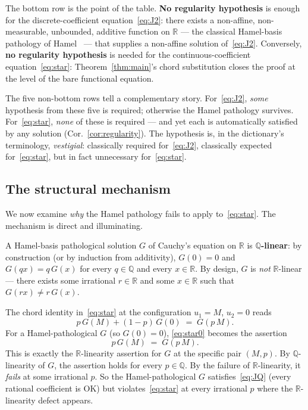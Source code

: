 \documentclass[review,12pt,a4paper]{elsarticle}
\theoremstyle{remark}
\newcommand{\R}{\mathbb R}
\newcommand{\Q}{\mathbb Q}
\begin{document}
The bottom row is the point of the table. \textbf{No regularity hypothesis}
is enough for the discrete-coefficient equation~\eqref{eq:J2}: there exists
a non-affine, non-measurable, unbounded, additive function on $\R$ --- the
classical Hamel-basis pathology of Hamel~\cite{Hamel1905} --- that
supplies a non-affine solution of~\eqref{eq:J2}. Conversely, \textbf{no
regularity hypothesis} is needed for the continuous-coefficient
equation~\eqref{eq:star}: Theorem~\ref{thm:main}'s chord substitution
closes the proof at the level of the bare functional equation.

The five non-bottom rows tell a complementary story. For~\eqref{eq:J2},
\emph{some} hypothesis from these five is required; otherwise the Hamel
pathology survives. For~\eqref{eq:star}, \emph{none} of these is required
--- and yet each is automatically satisfied by any solution
(Cor.~\ref{cor:regularity}). The hypothesis is, in the dictionary's
terminology, \emph{vestigial}: classically required for~\eqref{eq:J2},
classically expected for~\eqref{eq:star}, but in fact unnecessary
for~\eqref{eq:star}.

\subsection{The structural mechanism}
\label{ssec:mechanism}

We now examine \emph{why} the Hamel pathology fails to apply
to~\eqref{eq:star}. The mechanism is direct and illuminating.

A Hamel-basis pathological solution $G$ of Cauchy's equation on $\R$ is
\textbf{$\Q$-linear}: by construction (or by induction from additivity),
$G(0)=0$ and $G(qx)=q\,G(x)$ for every $q\in\Q$ and every $x\in\R$. By
design, $G$ is \emph{not} $\R$-linear --- there exists some irrational
$r\in\R$ and some $x\in\R$ such that $G(rx)\ne r\,G(x)$.

The chord identity in~\eqref{eq:star} at the configuration $u_1=M$,
$u_2=0$ reads
\begin{equation}
p\,G(M) + (1-p)\,G(0) \;=\; G(p\,M).
\tag{$\star_0$}\label{eq:star0}
\end{equation}
For a Hamel-pathological $G$ (so $G(0)=0$), \eqref{eq:star0} becomes the
assertion
\[
p\,G(M) \;=\; G(p\,M).
\]
This is exactly the $\R$-linearity assertion for $G$ at the specific pair
$(M,p)$. By $\Q$-linearity of $G$, the assertion holds for every $p\in\Q$.
By the failure of $\R$-linearity, it \emph{fails} at some irrational $p$.
So the Hamel-pathological $G$ satisfies~\eqref{eq:JQ} (every rational
coefficient is OK) but violates~\eqref{eq:star} at every irrational $p$
where the $\R$-linearity defect appears.
\end{document}
